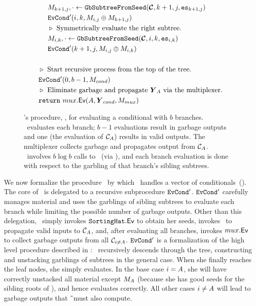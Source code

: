 \begin{figure}
\begin{align*}
    &~~~~~~\mat_{k+1,j}, \cdot \gets \gbtree(\vec{\cir}, k+1, j, \es_{k+1, j})\\
    &~~~~~~\evcond'(i, k, \mat_{i, j} \oplus \mat_{k+1,j})\\
    &~~~~~~\codecomment{Symmetrically evaluate the right subtree.}\\
    &~~~~~~\mat_{i, k}, \cdot \gets \gbtree(\vec{\cir}, i, k, \es_{i,k})\\
    &~~~~~~\evcond'(k+1, j, \mat_{i, j} \oplus \mat_{i, k})\\
    \\
    &~~\codecomment{Start recursive process from the top of the tree.}\\
    &~~\evcond'(0, b-1, M_{cond})\\
    &~~\codecomment{Eliminate garbage and propagate $\vec{Y}_\aid$ via
    the multiplexer.}\\
    &~~\creturn~\evmux(\aid, \vec{Y}_{cond}, M_{mux})
  \end{align*}
  \caption{%
    \E's procedure, \evcond, for evaluating a conditional with $b$ branches.
    \evcond\ evaluates each branch; $b-1$ evaluations
    result in garbage outputs and one (the evaluation of
    $\mathcal C_{A}$) results in valid outputs.
    The multiplexer collects garbage and propagates output from
    $\mathcal C_{A}$.
    \evcond\ involves $b \log b$ calls to \gGb\ (via \gbtree), and each
    branch evaluation is done with respect to the garbling of that
    branch's sibling subtrees.
  }\label{fig:evcond}
\end{figure}

We now formalize the procedure \evcond\ by which \E\ handles a vector of
conditionals~().
%
The core of \evcond\ is delegated to a recursive subprocedure $\mathtt{EvCond}'$.
$\mathtt{EvCond}'$ carefully manages material and uses the garblings of sibling
subtrees to evaluate each branch while limiting the possible number of
garbage outputs.
Other than this delegation, \evcond\ simply invokes $\mathtt{SortingHat}.\textsf{Ev}$
to obtain her seeds, invokes \evdem\ to propagate valid inputs to $\mathcal C_{A}$,
and, after evaluating all branches, invokes $mux.\textsf{Ev}$ to collect
garbage outputs from all $\mathcal C_{i \neq A}$.
%
$\mathtt{EvCond}'$ is a formalization of the high level procedure described in
: \E\ recursively descends through the tree,
constructing and unstacking garblings of subtrees in the general case.
%
When she finally reaches the leaf nodes, she simply evaluates.
%
In the base case $i = A$, she will have correctly unstacked all
material except $M_{A}$ (because she has good seeds for the
sibling roots of \aid), and hence evaluates correctly.
%
All other cases $i \neq A$ will lead to garbage outputs that \G\
must also compute.

